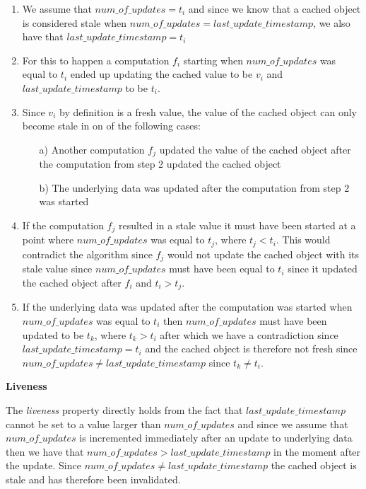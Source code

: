 \begin{enumerate}
  \item We assume that $num\_of\_updates = t_i$ and since we know that a cached object is considered stale when $num\_of\_updates = last\_update\_timestamp$, we also have that $last\_update\_timestamp = t_i$
  \item For this to happen a computation $f_i$ starting when $num\_of\_updates$ was equal to $t_i$ ended up updating the cached value to be $v_i$ and $last\_update\_timestamp$ to be $t_i$.
  \item Since $v_i$ by definition is a fresh value, the value of the cached object can only become stale in on of the following cases:
    \begin{enumerate}
      \item[a)] Another computation $f_j$ updated the value of the cached object after the computation from step 2 updated the cached object
      \item[b)] The underlying data was updated after the computation from step 2 was started
    \end{enumerate}
  \item If the computation $f_j$ resulted in a stale value it must have been started at a point where $num\_of\_updates$ was equal to $t_j$, where $t_j < t_i$. This would contradict the algorithm since $f_j$ would not update the cached object with its stale value since $num\_of\_updates$ must have been equal to $t_i$ since it updated the cached object after $f_i$ and $t_i > t_j$.
  \item If the underlying data was updated after the computation was started when $num\_of\_updates$ was equal to $t_i$ then $num\_of\_updates$ must have been updated to be $t_k$, where $t_k > t_i$ after which we have a contradiction since $last\_update\_timestamp = t_i$ and the cached object is therefore not fresh since $num\_of\_updates \neq last\_update\_timestamp$ since $t_k \neq t_i$.
\end{enumerate}

\textbf{Liveness}

The \emph{liveness} property directly holds from the fact that $last\_update\_timestamp$ cannot be set to a value larger than $num\_of\_updates$ and since we assume that $num\_of\_updates$ is incremented immediately after an update to underlying data then we have that $num\_of\_updates > last\_update\_timestamp$ in the moment after the update. Since $num\_of\_updates \neq last\_update\_timestamp$ the cached object is stale and has therefore been invalidated.


